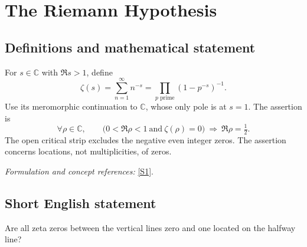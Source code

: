 \documentclass[11pt]{article}
\newcommand{\C}{\mathbb{C}}
\newcommand{\sref}[2]{\hyperlink{source:#1:#2}{[S#2]}}
\newif\ifshowcatalogue
\newcommand{\cataloguescope}[1]{\ifshowcatalogue
 \paragraph{Exact scope in the supplied catalogue.}
 \begin{quote}\small #1\end{quote}\fi}
\begin{document}
\setcounter{section}{0}
\clearpage
\section*{\texorpdfstring{The Riemann Hypothesis}{The Riemann Hypothesis}}\label{statement}
\subsection{Definitions and mathematical statement}
For $s\in\C$ with $\Re s>1$, define
\[
 \zeta(s)=\sum_{n=1}^{\infty}n^{-s}=\prod_{p\text{ prime}}(1-p^{-s})^{-1}.
\]
Use its meromorphic continuation to $\C$, whose only pole is at $s=1$. The assertion is
\[
 \forall\rho\in\C,\qquad \bigl(0<\Re\rho<1\ \text{and}\ \zeta(\rho)=0\bigr)
 \ \Longrightarrow\ \Re\rho=\tfrac12.
\]
The open critical strip excludes the negative even integer zeros. The assertion concerns locations, not multiplicities, of zeros.
\par\smallskip\textit{Formulation and concept references:} \sref{statement}{1}.
\cataloguescope{For the meromorphic continuation of the Riemann zeta function zeta(s)=sum\_\{n>=1\} n\textasciicircum{}(-s), initially defined for Re(s)>1, every zero s in the open critical strip 0<Re(s)<1 has Re(s)=1/2. This is the Riemann Hypothesis for zeta alone; it does not assert simplicity of its zeros.}
\subsection{Short English statement}
Are all zeta zeros between the vertical lines zero and one located on the halfway line?
\end{document}
